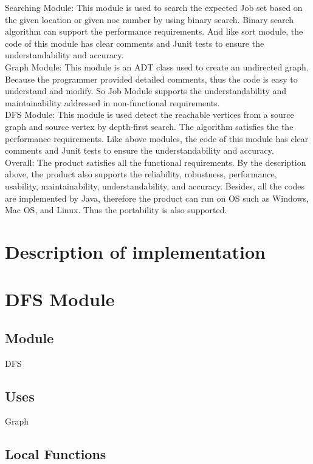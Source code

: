 \documentclass[12pt]{article}
\begin{document}
Searching Module: This module is used to search the expected Job set based on the given location or given noc number by using binary search. Binary search algorithm can support the performance requirements. And like sort module, the code of this module has clear comments and Junit tests to ensure the understandability and accuracy.\\\newline
Graph Module: This module is an ADT class used to create an undirected graph. Because the programmer provided detailed comments, thus the code is easy to understand and modify. So Job Module supports the understandability and maintainability addressed in non-functional requirements.\\\newline
DFS Module: This module is used detect the reachable vertices from a source graph and source vertex by depth-first search. The algorithm satisfies the the performance requirements. Like above modules, the code of this module has clear comments and Junit tests to ensure the understandability and accuracy.\\\newline
Overall: The product satisfies all the functional requirements. By the description above, the product also supports the reliability, robustness, performance, usability, maintainability, understandability, and accuracy. Besides, all the codes are implemented by Java, therefore the product can run on OS such as Windows, Mac OS, and Linux. Thus the portability is also supported.
\newpage
\section{Description of implementation}
\section* {DFS Module}

\subsection*{Module}

DFS

\subsection* {Uses}

Graph

\subsection*{Local Functions}
\end{document}
